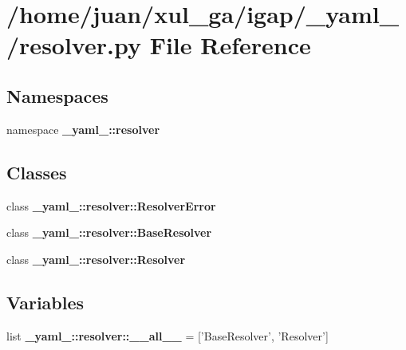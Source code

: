 \section{/home/juan/xul\_\-ga/igap/\_\-yaml\_\-/resolver.py File Reference}
\label{resolver_8py}
\subsection*{Namespaces}
\begin{CompactItemize}
\item 
namespace {\bf \_\-yaml\_\-::resolver}
\end{CompactItemize}
\subsection*{Classes}
\begin{CompactItemize}
\item 
class {\bf \_\-yaml\_\-::resolver::ResolverError}
\item 
class {\bf \_\-yaml\_\-::resolver::BaseResolver}
\item 
class {\bf \_\-yaml\_\-::resolver::Resolver}
\end{CompactItemize}
\subsection*{Variables}
\begin{CompactItemize}
\item 
list {\bf \_\-yaml\_\-::resolver::\_\-\_\-all\_\-\_\-} = ['BaseResolver', 'Resolver']
\end{CompactItemize}
